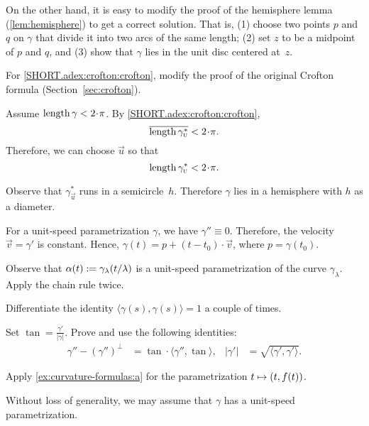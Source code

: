 \begin{multicols}{2}
On the other hand, it is easy to modify the proof of the hemisphere lemma (\ref{lem:hemisphere}) to get a correct solution.
That is, (1) choose two points $p$ and $q$ on $\gamma$ that divide it into two arcs of the same length;
(2) set $z$ to be a midpoint of $p$ and $q$,
and (3) show that $\gamma$ lies in the unit disc centered at~$z$.


For \ref{SHORT.adex:crofton:crofton}, modify the proof of the original Crofton formula
(Section~\ref{sec:crofton}).

Assume $\length \gamma<2\cdot\pi$.
By \ref{SHORT.adex:crofton:crofton},
\[\overline{\length \gamma^*_{\vec u}}<2\cdot\pi.\]
Therefore, we can choose ${\vec u}$ so that 
\[\length \gamma^*_{\vec u}<2\cdot\pi.\]

Observe that $\gamma^*_{\vec u}$ runs in a semicircle~$h$.
Therefore $\gamma$ lies in a hemisphere with $h$ as a diameter.


\setcounter{eqtn}{0}


For a unit-speed parametrization $\gamma$, we have $\gamma''\equiv 0$.
Therefore, the velocity $\vec v=\gamma'$ is constant.
Hence, $\gamma(t)=p+(t-t_0)\cdot \vec v$, where $p=\gamma(t_0)$.


Observe that $\alpha(t)\mathrel{:=}\gamma_{\lambda}(t/\lambda)$ is a unit-speed parametrization of the curve $ \gamma_{\lambda}$.
Apply the chain rule twice.


 Differentiate the identity $\langle\gamma(s),\gamma(s)\rangle=1$ a couple of times.

Set $\tan=\tfrac{\gamma'}{|\gamma|}$.
Prove and use the following identities: 
\begin{align*}
\gamma''-(\gamma'')^\perp&=\tan\cdot\langle\gamma'',\tan\rangle,
&
|\gamma'|&=\sqrt{\langle \gamma',\gamma'\rangle}.
\end{align*}

Apply \ref{ex:curvature-formulas:a} for the parametrization $t\z\mapsto (t,f(t))$.

Without loss of generality, we may assume that $\gamma$ has a unit-speed parametrization.


\end{multicols}
